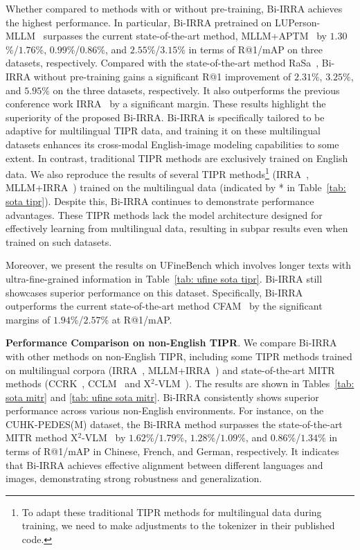 \documentclass[10pt,journal,compsoc]{IEEEtran}
\begin{document}
Whether compared to methods with or without pre-training, Bi-IRRA achieves the highest performance.
In particular, Bi-IRRA pretrained on LUPerson-MLLM~\cite{tan2024harnessing} surpasses the current state-of-the-art method, MLLM+APTM~\cite{tan2024harnessing} by \(1.30\)\%/\(1.76\)\%, \(0.99\)\%/\(0.86\)\%, and \(2.55\)\%/\(3.15\)\% in terms of R@1/mAP on three datasets, respectively. 
Compared with the state-of-the-art method RaSa~\cite{bai2023rasa}, Bi-IRRA without pre-training gains a significant R@1 improvement of \(2.31\%\), \(3.25\%\), and \(5.95\%\) on the three datasets, respectively.
It also outperforms the previous conference work IRRA~\cite{jiang2023cross} by a significant margin.
These results highlight the superiority of the proposed Bi-IRRA.
Bi-IRRA is specifically tailored to be adaptive for multilingual TIPR data, and training it on these multilingual datasets enhances its cross-modal English-image modeling capabilities to some extent. In contrast, traditional TIPR methods are exclusively trained on English data.
We also reproduce the results of several TIPR methods\footnote{To adapt these traditional TIPR methods for multilingual data during training, we need to make adjustments to the tokenizer in their published code.} (IRRA~\cite{jiang2023cross}, MLLM+IRRA~\cite{tan2024harnessing}) trained on the multilingual data (indicated by * in Table~\ref{tab: sota tipr}).
Despite this, Bi-IRRA continues to demonstrate performance advantages.
These TIPR methods lack the model architecture designed for effectively learning from multilingual data, resulting in subpar results even when trained on such datasets.

Moreover, we present the results on UFineBench which involves longer texts with ultra-fine-grained information in Table~\ref{tab: ufine sota tipr}. Bi-IRRA still showcases superior performance on this dataset. Specifically, Bi-IRRA outperforms the current state-of-the-art method CFAM~\cite{zuo2024ufinebench} by the significant margins of \(1.94\)\%/\(2.57\)\% at R@1/mAP.

\textbf{Performance Comparison on non-English TIPR}. 
We compare Bi-IRRA with other methods on non-English TIPR, including some TIPR methods trained on multilingual corpora (IRRA~\cite{jiang2023cross}, MLLM+IRRA~\cite{tan2024harnessing}) and state-of-the-art MITR methods (CCRK~\cite{nie2024improving}, CCLM~\cite{zeng2022cross} and X$^2$-VLM~\cite{zeng2023x}). The results are shown in Tables~\ref{tab: sota mitr} and \ref{tab: ufine sota mitr}.  
Bi-IRRA consistently shows superior performance across various non-English environments. 
For instance, on the CUHK-PEDES(M) dataset, the Bi-IRRA method surpasses the state-of-the-art MITR method X\(^2\)-VLM~\cite{zeng2023x} by \(1.62\%\)/\(1.79\%\), \(1.28\%\)/\(1.09\%\), and \(0.86\%\)/\(1.34\%\) in terms of R@1/mAP in Chinese, French, and German, respectively.
It indicates that Bi-IRRA achieves effective alignment between different languages and images, demonstrating strong robustness and generalization.
\end{document}
